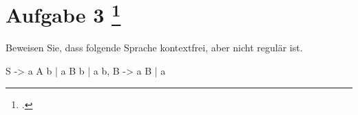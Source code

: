 \documentclass{lehramt-informatik-aufgabe}
\begin{document}
\section{Aufgabe 3
\footcite{66115:2012:03}}

Beweisen Sie, dass folgende Sprache kontextfrei, aber nicht regulär ist.

\begin{center}
\end{center}

\begin{liAntwort}

\begin{liProduktionsRegeln}
S -> a A b | a B b | a b,
B -> a B | a
\end{liProduktionsRegeln}
\end{liAntwort}
\end{document}
